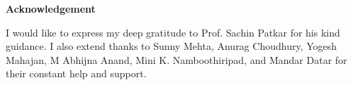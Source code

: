 \begin{Acknowledgement}
    \noindent
    \begin{center}
        {\Large \textbf{Acknowledgement}}\\
    \end{center}
    I would like to express my deep gratitude to Prof. Sachin Patkar for his kind guidance. I also extend thanks to Sunny Mehta, Anurag Choudhury, Yogesh Mahajan, M Abhijna Anand, Mini K. Namboothiripad, and Mandar Datar for their constant help and support.
    \begin{flushright}
    \end{flushright}

\end{Acknowledgement}